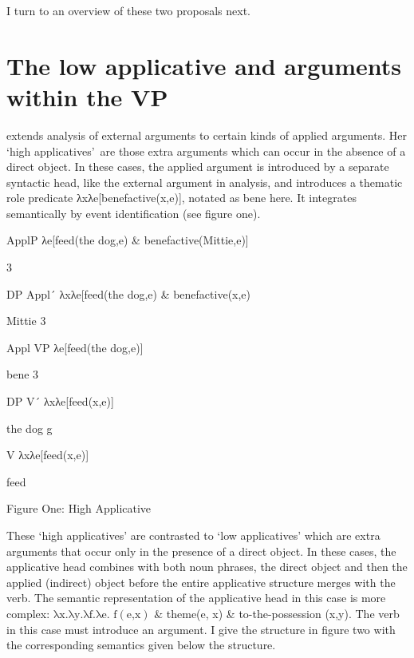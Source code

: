 \documentclass[output=paper,modfonts,nonflat]{langsci/langscibook}
\begin{document}
I turn to an overview of these two proposals next.

\section{The low applicative and arguments within the VP} %

\citet{Pylkkänen2008} extends  analysis of external arguments to certain kinds of applied arguments.  Her ‘high applicatives’~are those extra arguments which can occur in the absence of a direct object.  In these cases, the applied argument is introduced by a separate syntactic head, like the external argument in  analysis, and introduces a thematic role predicate λxλe[benefactive(x,e)], notated as bene here.  It integrates semantically by event identification (see figure one).

        ApplP    λe[feed(the dog,e) \& benefactive(Mittie,e)]

       3       

       DP        Appl´   λxλe[feed(the dog,e) \& benefactive(x,e)

  Mittie   3

    Appl          VP    λe[feed(the dog,e)]

bene    3

DP           V´    λxλe[feed(x,e)]

     the dog           g 

     V    λxλe[feed(x,e)]

   feed

\begin{stylecaption}
Figure One: High Applicative    
\end{stylecaption}

These ‘high applicatives’ are contrasted to ‘low applicatives’ which are extra arguments that occur only in the presence of a direct object.  In these cases, the applicative head combines with both noun phrases, the direct object and then the applied (indirect) object before the entire applicative structure merges with the verb.  The semantic representation of the applicative head in this case is more complex:  $\text{λx.λy.λf.λe}\text{. f}\left(\text{e,x}\right)\text{ \&} $  theme(e, x) \& to-the-possession (x,y).  The verb in this case must introduce an argument.  I give the structure in figure two with the corresponding semantics given below the structure.
\end{document}
